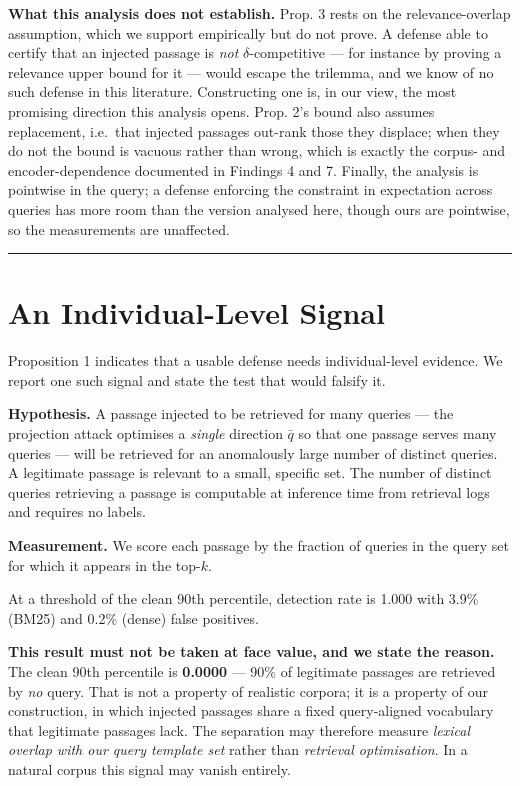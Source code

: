 \documentclass[authoryear,review,3p,times]{elsarticle}
\begin{document}
\textbf{What this analysis does not establish.} Prop. 3 rests on the relevance-overlap assumption, which we support empirically but do not prove. A defense able to certify that an injected passage is \emph{not} \(\delta\)-competitive --- for instance by proving a relevance upper bound for it --- would escape the trilemma, and we know of no such defense in this literature. Constructing one is, in our view, the most promising direction this analysis opens. Prop. 2's bound also assumes replacement, i.e.~that injected passages out-rank those they displace; when they do not the bound is vacuous rather than wrong, which is exactly the corpus- and encoder-dependence documented in Findings 4 and 7. Finally, the analysis is pointwise in the query; a defense enforcing the constraint in expectation across queries has more room than the version analysed here, though ours are pointwise, so the measurements are unaffected.

\begin{center}\rule{0.5\linewidth}{0.5pt}\end{center}

\section{An Individual-Level Signal}\label{an-individual-level-signal}

Proposition 1 indicates that a usable defense needs individual-level evidence. We report one such signal and state the test that would falsify it.

\textbf{Hypothesis.} A passage injected to be retrieved for many queries --- the projection attack optimises a \emph{single} direction \(\bar{q}\) so that one passage serves many queries --- will be retrieved for an anomalously large number of distinct queries. A legitimate passage is relevant to a small, specific set. The number of distinct queries retrieving a passage is computable at inference time from retrieval logs and requires no labels.

\textbf{Measurement.} We score each passage by the fraction of queries in the query set for which it appears in the top-\(k\).

At a threshold of the clean 90th percentile, detection rate is 1.000 with 3.9\% (BM25) and 0.2\% (dense) false positives.

\textbf{This result must not be taken at face value, and we state the reason.} The clean 90th percentile is \textbf{0.0000} --- 90\% of legitimate passages are retrieved by \emph{no} query. That is not a property of realistic corpora; it is a property of our construction, in which injected passages share a fixed query-aligned vocabulary that legitimate passages lack. The separation may therefore measure \emph{lexical overlap with our query template set} rather than \emph{retrieval optimisation}. In a natural corpus this signal may vanish entirely.
\end{document}
